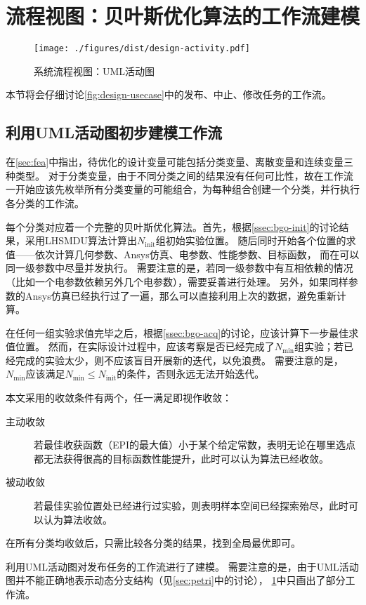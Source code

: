 \documentclass[index]{subfiles}
\begin{document}
\section{流程视图：贝叶斯优化算法的工作流建模}\label{sec:design-wf}
\begin{figure}[h]
  \centering
  \texttt{[image: ./figures/dist/design-activity.pdf]}
  \caption{系统流程视图：UML活动图\label{fig:design-activity}}
\end{figure}
本节将会仔细讨论\cref{fig:design-usecase}中的发布、中止、修改任务的工作流。

\subsection{利用UML活动图初步建模工作流}
在\cref{sec:fea}中指出，待优化的设计变量可能包括分类变量、离散变量和连续变量三种类型。
对于分类变量，由于不同分类之间的结果没有任何可比性，故在工作流一开始应该先枚举所有分类变量的可能组合，为每种组合创建一个分类，并行执行各分类的工作流。

每个分类对应着一个完整的贝叶斯优化算法。首先，根据\cref{ssec:bgo-init}的讨论结果，采用LHSMDU算法计算出$N_\mathrm{init}$组初始实验位置。
随后同时开始各个位置的求值——依次计算几何参数、Ansys仿真、电参数、性能参数、目标函数，
而在可以同一级参数中尽量并发执行。
需要注意的是，若同一级参数中有互相依赖的情况（比如一个电参数依赖另外几个电参数），需要妥善进行处理。
另外，如果同样参数的Ansys仿真已经执行过了一遍，那么可以直接利用上次的数据，避免重新计算。

在任何一组实验求值完毕之后，根据\cref{ssec:bgo-acq}的讨论，应该计算下一步最佳求值位置。
然而，在实际设计过程中，应该考察是否已经完成了$N_\mathrm{min}$组实验；若已经完成的实验太少，则不应该盲目开展新的迭代，以免浪费。
需要注意的是，$N_\mathrm{min}$应该满足$N_\mathrm{min} \leq N_\mathrm{init}$的条件，否则永远无法开始迭代。

本文采用的收敛条件有两个，任一满足即视作收敛：
\begin{description}
  \item[主动收敛] 若最佳收获函数（EPI的最大值）小于某个给定常数，表明无论在哪里选点都无法获得很高的目标函数性能提升，此时可以认为算法已经收敛。
  \item[被动收敛] 若最佳实验位置处已经进行过实验，则表明样本空间已经探索殆尽，此时可以认为算法收敛。
\end{description}

在所有分类均收敛后，只需比较各分类的结果，找到全局最优即可。

利用UML活动图对发布任务的工作流进行了建模。
需要注意的是，由于UML活动图并不能正确地表示动态分支结构（见\cref{sec:petri}中的讨论），
\cref{fig:design-activity}中只画出了部分工作流。
\end{document}

